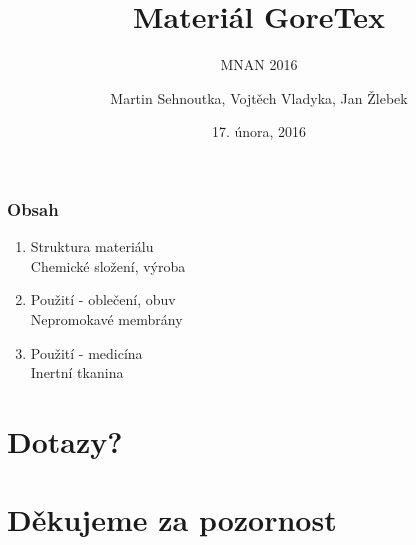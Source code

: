 \documentclass{beamer}
\title{Materiál GoreTex}
\subtitle{MNAN 2016}
\author{Martin Sehnoutka, Vojtěch Vladyka, Jan Žlebek}
\date{17. února, 2016}
\begin{document}
	  \frame{\titlepage}
	   
	  \begin{frame}
		\frametitle{Obsah}
		\begin{enumerate}
		  \item Struktura materiálu
		  \\ \textcolor{ExecusharesGrey}{\footnotesize\hspace{1em} Chemické složení, výroba}	
		  \item Použití - oblečení, obuv
		  \\ \textcolor{ExecusharesGrey}{\footnotesize\hspace{1em} Nepromokavé membrány}
		  \item Použití - medicína
		  \\ \textcolor{ExecusharesGrey}{\footnotesize\hspace{1em} Inertní tkanina}
		\end{enumerate}
		\end{frame}
		
		
		
		

		\section{Dotazy?}
	
		\section{Děkujeme za pozornost}
	
\end{document}
